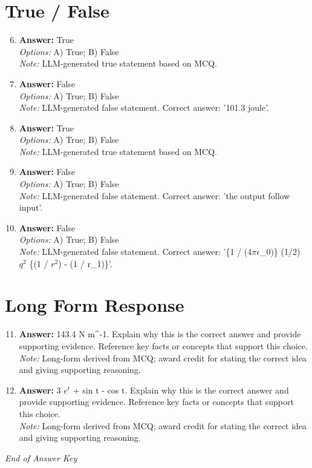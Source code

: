 \documentclass[12pt]{article}
\begin{document}
\section*{True / False}
\begin{enumerate}[label=\arabic*.]
\setcounter{enumi}{5}
\item \textbf{Answer:} True
\\ \textit{Options:} A) True; B) False
\\ \textit{Note:} LLM-generated true statement based on MCQ.
\item \textbf{Answer:} False
\\ \textit{Options:} A) True; B) False
\\ \textit{Note:} LLM-generated false statement. Correct answer: '101.3 joule'.
\item \textbf{Answer:} True
\\ \textit{Options:} A) True; B) False
\\ \textit{Note:} LLM-generated true statement based on MCQ.
\item \textbf{Answer:} False
\\ \textit{Options:} A) True; B) False
\\ \textit{Note:} LLM-generated false statement. Correct answer: 'the output follow input'.
\item \textbf{Answer:} False
\\ \textit{Options:} A) True; B) False
\\ \textit{Note:} LLM-generated false statement. Correct answer: '\{1 / (4\ensuremath{\pi}\ensuremath{\epsilon}\_0)\} (1/2) $q^2$ \{(1 / $r^2$) - (1 / r\_1)\}'.
\end{enumerate}

\section*{Long Form Response}
\begin{enumerate}[label=\arabic*.]
\setcounter{enumi}{10}
\item \textbf{Answer:} 143.4 N m^-1. Explain why this is the correct answer and provide supporting evidence. Reference key facts or concepts that support this choice.
\\ \textit{Note:} Long-form derived from MCQ; award credit for stating the correct idea and giving supporting reasoning.
\item \textbf{Answer:} 3 $e^t$ + sin t - cos t. Explain why this is the correct answer and provide supporting evidence. Reference key facts or concepts that support this choice.
\\ \textit{Note:} Long-form derived from MCQ; award credit for stating the correct idea and giving supporting reasoning.
\end{enumerate}

\vfill
\noindent\textit{End of Answer Key}
\end{document}
